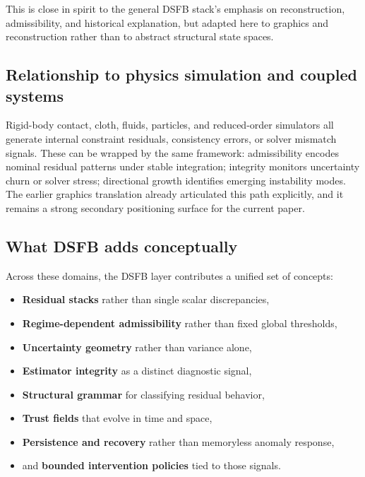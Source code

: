 \documentclass[11pt]{article}
\theoremstyle{definition}
\theoremstyle{plain}
\begin{document}
This is close in spirit to the general DSFB stack’s emphasis on reconstruction, admissibility, and historical explanation, but adapted here to graphics and reconstruction rather than to abstract structural state spaces. 


\subsection{Relationship to physics simulation and coupled systems}

Rigid-body contact, cloth, fluids, particles, and reduced-order simulators all generate internal constraint residuals, consistency errors, or solver mismatch signals. These can be wrapped by the same framework: admissibility encodes nominal residual patterns under stable integration; integrity monitors uncertainty churn or solver stress; directional growth identifies emerging instability modes. The earlier graphics translation already articulated this path explicitly, and it remains a strong secondary positioning surface for the current paper. 


\subsection{What DSFB adds conceptually}

Across these domains, the DSFB layer contributes a unified set of concepts:
\begin{itemize}[leftmargin=1.5em]
    \item \textbf{Residual stacks} rather than single scalar discrepancies,
    \item \textbf{Regime-dependent admissibility} rather than fixed global thresholds,
    \item \textbf{Uncertainty geometry} rather than variance alone,
    \item \textbf{Estimator integrity} as a distinct diagnostic signal,
    \item \textbf{Structural grammar} for classifying residual behavior,
    \item \textbf{Trust fields} that evolve in time and space,
    \item \textbf{Persistence and recovery} rather than memoryless anomaly response,
    \item and \textbf{bounded intervention policies} tied to those signals.
\end{itemize}
\end{document}
